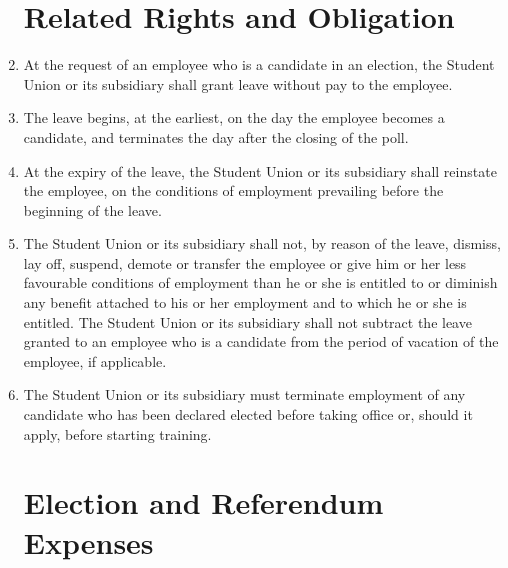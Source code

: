 \documentclass[oneside]{book}
\begin{document}
\begin{enumerate}
\chapter{\label{Related_Rights_and_Obligation}Related Rights and Obligation }
\item At the request of an employee who is a candidate in an election, the
Student Union or its subsidiary shall grant leave without pay to the
employee. 
\item The leave begins, at the earliest, on the day the employee becomes
a candidate, and terminates the day after the closing of the poll. 
\item At the expiry of the leave, the Student Union or its subsidiary shall
reinstate the employee, on the conditions of employment prevailing
before the beginning of the leave. 
\item The Student Union or its subsidiary shall not, by reason of the leave,
dismiss, lay off, suspend, demote or transfer the employee or give
him or her less favourable conditions of employment than he or she
is entitled to or diminish any benefit attached to his or her employment
and to which he or she is entitled. The Student Union or its subsidiary
shall not subtract the leave granted to an employee who is a candidate
from the period of vacation of the employee, if applicable. 
\item The Student Union or its subsidiary must terminate employment of any
candidate who has been declared elected before taking office or, should
it apply, before starting training. 

\chapter{\label{Election_and_Referendum_Expenses}Election and Referendum
Expenses }



\end{enumerate}
\end{document}
